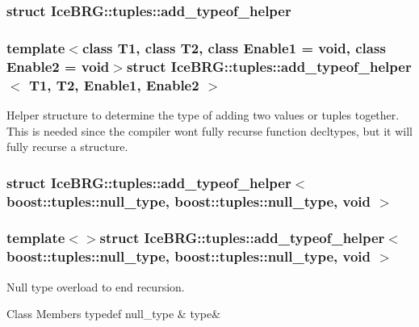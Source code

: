 \subsubsection{struct Ice\+B\+R\+G\+:\+:tuples\+:\+:add\+\_\+typeof\+\_\+helper}
\subsubsection*{template$<$class T1, class T2, class Enable1 = void, class Enable2 = void$>$struct Ice\+B\+R\+G\+::tuples\+::add\+\_\+typeof\+\_\+helper$<$ T1, T2, Enable1, Enable2 $>$}

Helper structure to determine the type of adding two values or tuples together. This is needed since the compiler won\textquotesingle{}t fully recurse function decltypes, but it will fully recurse a structure. \label{structIceBRG_1_1tuples_1_1add__typeof__helper_3_01boost_1_1tuples_1_1null__type_00_01boost_1_1tuc2970434d93561fa1e1db195cb99b491}
\hypertarget{namespaceIceBRG_1_1tuples_structIceBRG_1_1tuples_1_1add__typeof__helper_3_01boost_1_1tuples_1_1null__type_00_01boost_1_1tuc2970434d93561fa1e1db195cb99b491}{}
\subsubsection{struct Ice\+B\+R\+G\+:\+:tuples\+:\+:add\+\_\+typeof\+\_\+helper$<$ boost\+:\+:tuples\+:\+:null\+\_\+type, boost\+:\+:tuples\+:\+:null\+\_\+type, void $>$}
\subsubsection*{template$<$$>$struct Ice\+B\+R\+G\+::tuples\+::add\+\_\+typeof\+\_\+helper$<$ boost\+::tuples\+::null\+\_\+type, boost\+::tuples\+::null\+\_\+type, void $>$}

Null type overload to end recursion. \begin{DoxyFields}{Class Members}
\hypertarget{namespaceIceBRG_1_1tuples_a42185186c3594c65a4b8bfc24149ce2e}{}typedef null\+\_\+type\label{namespaceIceBRG_1_1tuples_a42185186c3594c65a4b8bfc24149ce2e}
&
type&
\\
\hline

\end{DoxyFields}
\label{structIceBRG_1_1tuples_1_1add__typeof__helper_3_01boost_1_1tuples_1_1null__type_00_01T_00_01void_01_4}
\hypertarget{namespaceIceBRG_1_1tuples_structIceBRG_1_1tuples_1_1add__typeof__helper_3_01boost_1_1tuples_1_1null__type_00_01T_00_01void_01_4}{}
